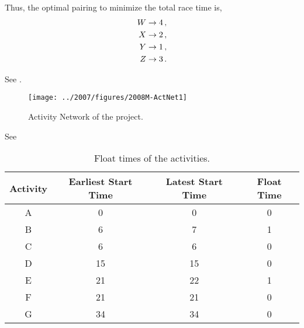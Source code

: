 \begin{subquestions}
Thus, the optimal pairing to minimize the total race time is,
\begin{align}
	W \rightarrow 4 \,, \nonumber \\
	X \rightarrow 2 \,, \nonumber \\
	Y \rightarrow 1 \,, \nonumber \\
	Z \rightarrow 3 \,.
\end{align}


\subquestion

See .
\begin{figure}
	\begin{center}
		\texttt{[image: ../2007/figures/2008M-ActNet1]}
		\caption{\label{2008M:q2:fig:ActNet1} Activity Network of the project.}
	\end{center}
\end{figure}


\subquestion 

\begin{subsubquestions}
	
\subsubquestion

See 
\begin{table}[ht]
	\centering
	\begin{tabular}{|c|c|c|c|}
		\hline
		Activity & Earliest Start Time & Latest Start Time & Float Time \\
		\hline
		A & 0 & 0 & 0 \\
		B & 6 & 7 & 1 \\
		C & 6 & 6 & 0 \\
		D & 15 & 15 & 0 \\
		E & 21 & 22 & 1 \\
		F & 21 & 21 & 0 \\
		G & 34 & 34 & 0 \\
		\hline
	\end{tabular}
	\caption{\label{2008M:q2:tab:ActNet2} Float times of the activities.}
\end{table} 


\end{subsubquestions}
\end{subquestions}
